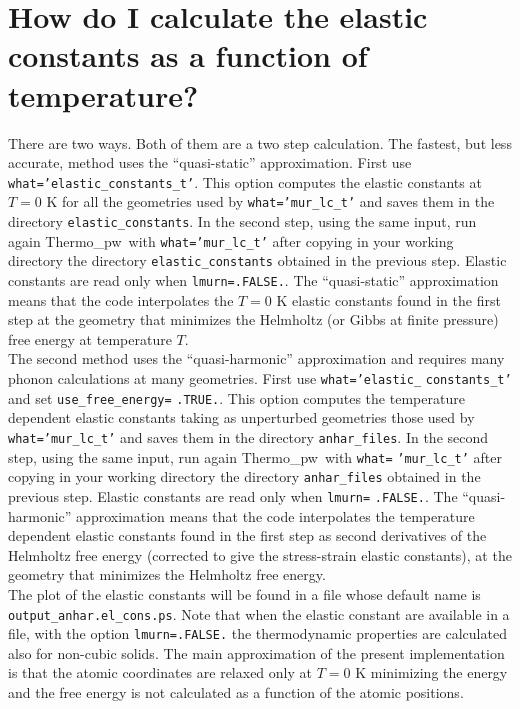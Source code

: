 \documentclass[12pt,a4paper,twoside]{report}
\def\thermo{{\sc Thermo}\_{\sc pw}}
\begin{document}
\newpage
{\color{coral}\section{How do I calculate the elastic constants 
as a function of temperature?}}
\color{black}
There are two ways. Both of them are a two step calculation. 
The fastest, but less accurate, method uses the ``quasi-static'' approximation.
First use 
\texttt{what='elastic\_constants\_t'}. This option computes the elastic
constants at $T=0$ K for all the geometries used by 
\texttt{what='mur\_lc\_t'} and
saves them in the directory \texttt{elastic\_constants}.  
In the second step, using the same input, run again 
\thermo\ with \texttt{what='mur\_lc\_t'} after copying in your
working directory the directory \texttt{elastic\_constants} obtained 
in the previous step. Elastic constants are read only when
\texttt{lmurn=.FALSE.}.
The ``quasi-static'' approximation means that the code interpolates
the $T=0$ K elastic constants found in the first step at the geometry that
minimizes the Helmholtz (or Gibbs at finite pressure) free energy at
temperature $T$. \\
The second method uses the ``quasi-harmonic'' approximation and
requires many phonon calculations at many geometries.
First use \texttt{what='elastic\_} \texttt{constants\_t'} and set
\texttt{use\_free\_energy=} \texttt{.TRUE.}. This option computes the 
temperature dependent elastic constants taking as unperturbed geometries 
those used by \texttt{what='mur\_lc\_t'} and saves them in the directory 
\texttt{anhar\_files}.  
In the second step, using the same input, run again 
\thermo\ with \texttt{what=} \texttt{'mur\_lc\_t'} after 
copying in your
working directory the directory \texttt{anhar\_files} obtained 
in the previous step. Elastic constants are read only when
\texttt{lmurn=} \texttt{.FALSE.}. 
The ``quasi-harmonic'' approximation means that the code interpolates
the temperature dependent elastic constants found in the first step as
second derivatives of the Helmholtz free energy (corrected to give the
stress-strain elastic constants), at the geometry that
minimizes the Helmholtz free energy. \\
The plot of the elastic constants will be found in a file whose default
name is \texttt{output\_anhar.el\_cons.ps}.
Note that when the elastic constant are available in a file, 
with the option \texttt{lmurn=.FALSE.} the thermodynamic properties 
are calculated also for non-cubic solids.
The main approximation of the present implementation is that the atomic 
coordinates are relaxed only at $T=0$ K minimizing the energy and
the free energy is 
not calculated as a function of the atomic positions.
\end{document}
